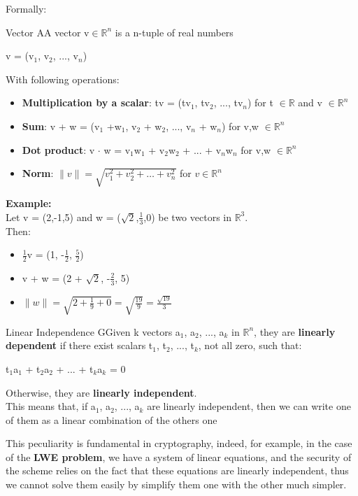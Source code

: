 \noindent
Formally:
\begin{defBox}{Vector}
    AA vector v$\in \mathbb{R}^n$ is a n-tuple of real numbers
        \begin{center}
            v = (v$_1$, v$_2$, ..., v$_n$)
        \end{center}
    
    \noindent
    With following operations:

        \begin{itemize}
        \item \textbf{Multiplication by a scalar}: tv = (tv$_1$, tv$_2$, ..., tv$_n$) for t $\in \mathbb{R}$ and v $\in \mathbb{R}^n$
        \item \textbf{Sum}: v + w = (v$_1$ +w$_1$, v$_2$ + w$_2$, ..., v$_n$ + w$_n$) for v,w $\in \mathbb{R}^n$
        \item \textbf{Dot product}: v $\cdot$ w = v$_1$w$_1$ + v$_2$w$_2$ + ... + v$_n$w$_n$ for v,w $\in \mathbb{R}^n$
        \item \textbf{Norm}: $\|v\| = \sqrt{v_1^2 + v_2^2 + \dots + v_n^2}$ for $v \in \mathbb{R}^n$
        \end{itemize}
\end{defBox}
\noindent
\textbf{Example:}\\
Let v = (2,-1,5) and w = ($\sqrt{2}$,$\frac{1}{3}$,0) be two vectors in $\mathbb{R}^3$.\\
Then:
\begin{itemize}
    \item $\frac{1}{2}$v = (1, -$\frac{1}{2}$, $\frac{5}{2}$)
    \item v + w = (2 + $\sqrt{2}$, -$\frac{2}{3}$, 5)
    \item $\|w\| = \sqrt{2 + \frac{1}{9} + 0} = \sqrt{\frac{19}{9}} = \frac{\sqrt{19}}{3}$
\end{itemize}

\begin{defBox}{Linear Independence}
   GGiven k vectors a$_1$, a$_2$, ..., a$_k$ in $\mathbb{R}^n$, they are \textbf{linearly dependent} if there exist scalars t$_1$, t$_2$, ..., t$_k$, not all zero, such that:
    \begin{center}
        t$_1$a$_1$ + t$_2$a$_2$ + ... + t$_k$a$_k$ = 0
    \end{center}
    Otherwise, they are \textbf{linearly independent}.\\
    This means that, if a$_1$, a$_2$, ..., a$_k$ are linearly independent, then we can write one of them as a linear combination of the others one
\end{defBox}
\noindent
This peculiarity is fundamental in cryptography, indeed, for example, in the case of the \textbf{LWE problem}, we have a system of linear equations, and the security of the scheme relies on the fact that these equations are linearly independent, thus we cannot solve them easily by simplify them one with the other much simpler.
\medskip

